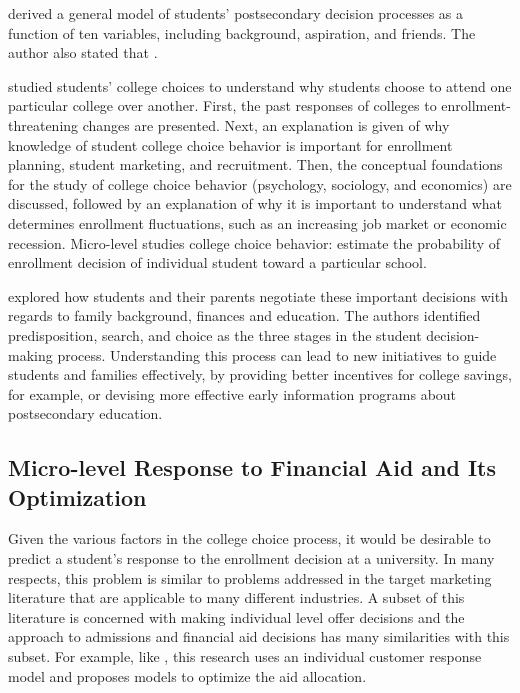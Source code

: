 \documentclass[12pt,english]{report}
\begin{document}
\citet{Jackson1978} derived a general model of students' postsecondary decision processes as a function of ten variables, including background, aspiration, and friends. The author also stated that .

\citet{Paulsen1990} studied students' college choices to understand why students choose to attend one particular college over another. First, the past responses of colleges to enrollment-threatening changes are presented. Next, an explanation is given of why knowledge of student college choice behavior is important for enrollment planning, student marketing, and recruitment. Then, the conceptual foundations for the study of college choice behavior (psychology, sociology, and economics) are discussed, followed by an explanation of why it is important to understand what determines enrollment fluctuations, such as an increasing job market or economic recession. Micro-level studies college choice behavior: estimate the probability of enrollment decision of individual student
toward a particular school.

\citet{Hossler1998} explored how students and their parents negotiate these important decisions with regards to family background, finances and education. The authors identified predisposition, search, and choice as the three stages in the student decision-making process. Understanding this process can lead to new initiatives to guide students and families effectively, by providing better incentives for college savings, for example, or devising more effective early information programs about postsecondary education.

\subsection{Micro-level Response to Financial Aid and Its Optimization} 
Given the various factors in the college choice process, it would be desirable to predict a student's response to the enrollment decision at a university.  In many respects, this problem is similar to problems addressed in the target marketing literature that are applicable to many different industries. A subset of this literature is concerned with making individual level offer decisions \citep{Venkatesan2004} and the approach to admissions and financial aid decisions has many similarities with this subset.  For example, like \citep{Carter2011}, this research uses an individual customer response model and proposes  models to optimize the aid allocation.
\end{document}

